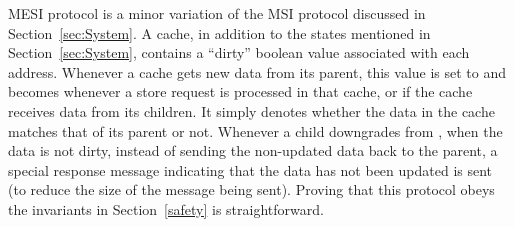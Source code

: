 %
%
%
%

MESI protocol is a minor variation of the MSI protocol discussed in
Section~\ref{sec:System}.  A cache, in addition to the states mentioned in
Section~\ref{sec:System}, contains a ``dirty'' boolean value associated with
each address.  Whenever a cache gets new data from its parent, this value is set
to \False{} and becomes \True{} whenever a store request is processed in that
cache, or if the cache receives data from its children. It simply denotes
whether the data in the cache matches that of its parent or not.  Whenever a
child downgrades from \Mo{}, when the data is not dirty, instead of sending the
non-updated data back to the parent, a special response message indicating that
the data has not been updated is sent (to reduce the size of the message being
sent). Proving that this protocol obeys the invariants in Section~\ref{safety}
is straightforward.

